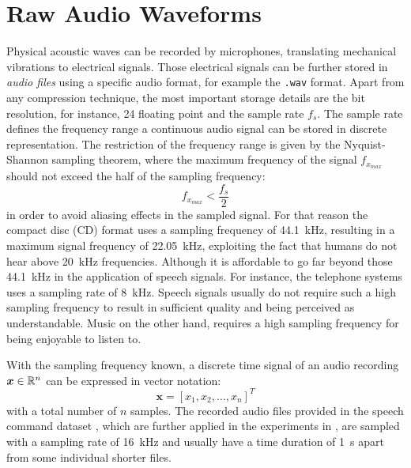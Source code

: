 
\section{Raw Audio Waveforms}\label{sec:signal_raw}
Physical acoustic waves can be recorded by microphones, translating mechanical vibrations to electrical signals. 
Those electrical signals can be further stored in \emph{audio files} using a specific audio format, for example the \texttt{.wav} format.
Apart from any compression technique, the most important storage details are the bit resolution, for instance, \SI{24}{\bit} floating point and the sample rate $f_s$.
The sample rate defines the frequency range a continuous audio signal can be stored in discrete representation.
The restriction of the frequency range is given by the Nyquist-Shannon sampling theorem, where the maximum frequency of the signal $f_{x_{max}}$ should not exceed the half of the sampling frequency:
\begin{equation}\label{eq:signal_raw_nyquist}
  f_{x_{max}} < \frac{f_s}{2}
\end{equation}
in order to avoid aliasing effects in the sampled signal.
For that reason the compact disc (CD) format uses a sampling frequency of \SI{44.1}{\kilo\hertz}, resulting in a maximum signal frequency of \SI{22.05}{\kilo\hertz}, exploiting the fact that humans do not hear above \SI{20}{\kilo\hertz} frequencies.
Although it is affordable to go far beyond those \SI{44.1}{\kilo\hertz} in the application of speech signals. 
For instance, the telephone systems uses a sampling rate of \SI{8}{\kilo\hertz}.
Speech signals usually do not require such a high sampling frequency to result in sufficient quality and being perceived as understandable.
Music on the other hand, requires a high sampling frequency for being enjoyable to listen to.

With the sampling frequency known, a discrete time signal of an audio recording $\bm{x} \in \mathbb{R}^n$ can be expressed in vector notation:
\begin{equation}\label{eq:signal_raw_x}
  \bm{x} = [x_1, x_2, \dots, x_n]^T
\end{equation}
with a total number of $n$ samples.
The recorded audio files provided in the speech command dataset \cite{Warden2018}, which are further applied in the experiments in , are sampled with a sampling rate of \SI{16}{\kilo\hertz} and usually have a time duration of \SI{1}{\second} apart from some individual shorter files.

